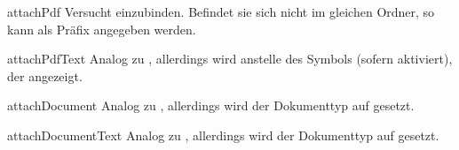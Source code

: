 \documentclass{sopra-base}
\begin{document}
\begin{command}{attachPdf}{}
    Versucht  einzubinden. Befindet sie sich nicht im gleichen Ordner, so kann
     als Präfix angegeben werden. 
\end{command}

\begin{command}{attachPdfText}{}
    Analog zu , allerdings wird anstelle des Symbols (sofern aktiviert),
    der  angezeigt.
\end{command}

\begin{command}{attachDocument}{}
    Analog zu , allerdings wird der Dokumenttyp auf  gesetzt. 
\end{command}

\begin{command}{attachDocumentText}{}
    Analog zu , allerdings wird der Dokumenttyp auf  gesetzt. 
\end{command}
\end{document}
